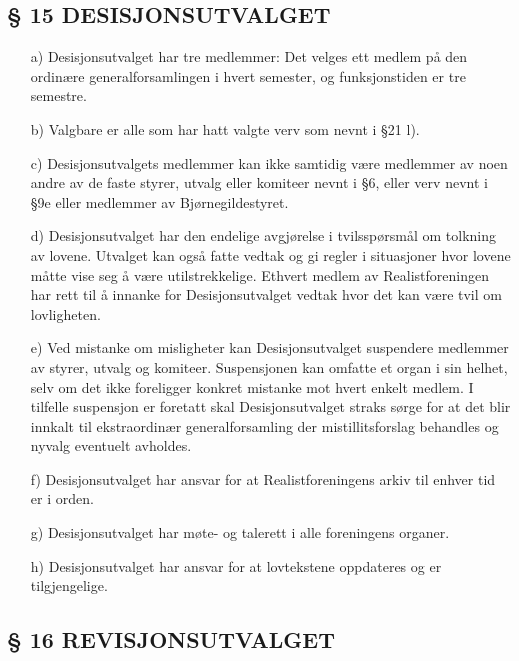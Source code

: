 \subsection*{§ 15 DESISJONSUTVALGET}

\begin{itemize}
\item[a)] Desisjonsutvalget har tre medlemmer: Det velges ett medlem på den
ordinære generalforsamlingen i hvert semester, og funksjonstiden er
tre semestre.

\item[b)] Valgbare er alle som har hatt valgte verv som nevnt i §21 l).

\item[c)] Desisjonsutvalgets medlemmer kan ikke samtidig være medlemmer av
noen andre av de faste styrer, utvalg eller komiteer nevnt i §6, eller
verv nevnt i §9e eller medlemmer av Bjørnegildestyret.

\item[d)] Desisjonsutvalget har den endelige avgjørelse i tvilsspørsmål om
tolkning av lovene. Utvalget kan også fatte vedtak og gi regler i
situasjoner hvor lovene måtte vise seg å være utilstrekkelige. Ethvert
medlem av Realistforeningen har rett til å innanke for
Desisjonsutvalget vedtak hvor det kan være tvil om lovligheten.

\item[e)] Ved mistanke om misligheter kan Desisjonsutvalget suspendere
medlemmer av styrer, utvalg og komiteer. Suspensjonen kan omfatte et
organ i sin helhet, selv om det ikke foreligger konkret mistanke mot
hvert enkelt medlem.  I tilfelle suspensjon er foretatt skal
Desisjonsutvalget straks sørge for at det blir innkalt til
ekstraordinær generalforsamling der mistillitsforslag behandles og
nyvalg eventuelt avholdes.

\item[f)] Desisjonsutvalget har ansvar for at Realistforeningens arkiv til
enhver tid er i orden.
	
\item[g)] Desisjonsutvalget har møte- og talerett i alle foreningens organer. 

\item[h)] Desisjonsutvalget har ansvar for at lovtekstene oppdateres og er tilgjengelige.
\end{itemize}


\subsection*{§ 16 REVISJONSUTVALGET}

